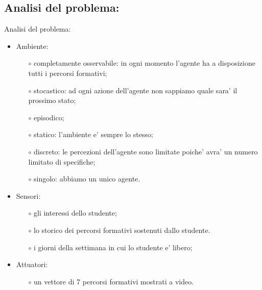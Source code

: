 \documentclass[10pt,a4paper]{article}
\begin{document}
    \subsection{Analisi del problema:}
      \label{analisiDelProblemaSubsection}
        Analisi del problema:\\
        \begin{itemize}
        \item Ambiente:
        \begin{itemize}
          \item[$\circ$] completamente osservabile: in ogni momento l'agente ha a disposizione tutti i percorsi formativi;
          \item[$\circ$] stocastico: ad ogni azione dell'agente non sappiamo quale sara' il prossimo stato;
          \item[$\circ$] episodico;
          \item[$\circ$] statico: l'ambiente e' sempre lo stesso;
          \item[$\circ$] discreto: le percezioni dell'agente sono limitate poiche' avra' un numero limitato di specifiche;
          \item[$\circ$] singolo: abbiamo un unico agente.
        \end{itemize}
        
        \item Sensori:
        \begin{itemize}
          \item[$\circ$] gli interessi dello studente;
          \item[$\circ$] lo storico dei percorsi formativi sostenuti dallo studente.
          \item[$\circ$] i giorni della settimana in cui lo studente e' libero;
        \end{itemize}
        
        \item Attuatori:
        \begin{itemize}
          \item[$\circ$] un vettore di 7 percorsi formativi mostrati a video.
        \end{itemize}
      \end{itemize}%
        
\end{document}
